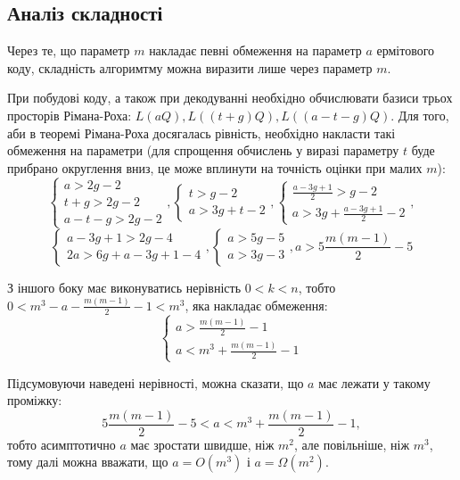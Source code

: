\documentclass[a4paper,12pt,oneside]{article}
\begin{document}
\subsection{Аналіз складності}
Через те, що параметр $m$ накладає певні обмеження на параметр $a$ ермітового коду, складність алгоримтму 
можна виразити лише через параметр $m$.

При побудові коду, а також при декодуванні необхідно обчислювати базиси трьох просторів Рімана-Роха: $L(aQ), L( (t+g)Q ), L( (a-t-g)Q)$. 
Для того, аби в теоремі Рімана-Роха досягалась рівність, необхідно накласти такі обмеження на параметри (для спрощення обчислень у виразі параметру $t$ 
буде прибрано округлення вниз, це може вплинути на точність оцінки при малих $m$):
$$
\begin{cases}
    a > 2g - 2 \\
    t+g > 2g - 2 \\
    a - t -g > 2g -2
\end{cases},
\begin{cases}
    t > g - 2 \\
    a > 3g + t - 2
\end{cases},
\begin{cases}
    \frac{a-3g+1}{2} > g - 2 \\
    a > 3g + \frac{a-3g+1}{2} - 2
\end{cases},
$$
$$
\begin{cases}
    a-3g+1 > 2g - 4 \\
    2a > 6g + a-3g+1 - 4
\end{cases},
\begin{cases}
    a > 5g - 5 \\
    a > 3g - 3
\end{cases},
a > 5 \frac{m(m-1)}{2} - 5
$$

З іншого боку має виконуватись нерівність $0 < k < n$, тобто $0 < m^3 - a - \frac{m(m-1)}{2} - 1 < m^3$, яка накладає обмеження:
$$
\begin{cases}
    a > \frac{m(m-1)}{2} - 1 \\
    a < m^3 + \frac{m(m-1)}{2} - 1
\end{cases}
$$

Підсумовуючи наведені нерівності, можна сказати, що $a$ має лежати у такому проміжку:
$$5 \frac{m(m-1)}{2} - 5 < a < m^3 + \frac{m(m-1)}{2} - 1,$$
тобто асимптотично $a$ має зростати швидше, ніж $m^2$, але повільніше, ніж $m^3$, тому далі можна вважати, що $a=O(m^3)$ і $a=\Omega(m^2)$.
\end{document}
